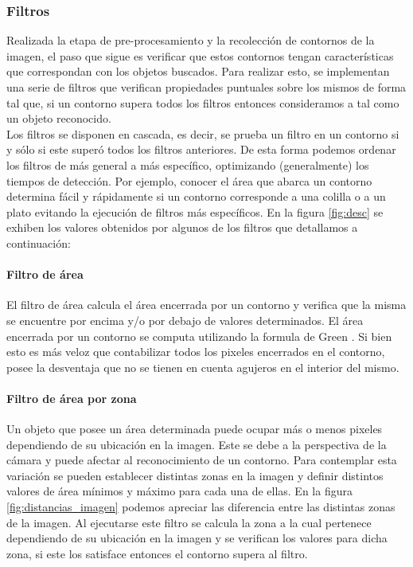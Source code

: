 	

	\subsubsection{\label{sec:filtros} Filtros}
	Realizada la etapa de pre-procesamiento y la recolecci\'on de contornos 
	de la imagen, el paso que sigue es verificar que estos
	contornos tengan caracter\'isticas que correspondan con  los 
	objetos buscados. Para realizar esto, se implementan una serie de filtros que verifican propiedades
	puntuales sobre los mismos de forma tal que, si un contorno supera todos los filtros entonces consideramos a tal como un objeto reconocido. \\
	\indent Los filtros se disponen en cascada, es decir, se prueba un 
	filtro en un contorno si y s\'olo si este super\'o todos los filtros 
	anteriores. De esta forma podemos ordenar los filtros de m\'as general 
	a m\'as espec\'ifico, optimizando (generalmente) los tiempos de detecci\'on. Por ejemplo, conocer 
	el \'area que abarca un contorno determina f\'acil y r\'apidamente si un contorno corresponde a una colilla o a un plato evitando la ejecuci\'on
	de filtros m\'as espec\'ificos. En la figura \ref{fig:desc} se exhiben 
	los valores obtenidos por algunos de los filtros que detallamos a 
	continuaci\'on:
	\paragraph{Filtro de \'area}
	El filtro de \'area calcula el \'area encerrada por un contorno y verifica que la misma se encuentre por encima y/o por debajo
	de valores determinados. El \'area encerrada por un contorno se computa utilizando la formula de Green \cite{greenwolfram}.
	Si bien esto es m\'as veloz que contabilizar todos los pixeles encerrados en el contorno, posee la desventaja que no se tienen en cuenta agujeros
	en el interior del mismo.
	\paragraph{Filtro de \'area por zona}
	Un objeto que posee un \'area determinada puede ocupar m\'as o menos pixeles dependiendo de su ubicaci\'on en la imagen. Este se debe a la 
	perspectiva de la c\'amara y puede afectar al reconocimiento de un contorno. Para contemplar esta variaci\'on se pueden establecer distintas
	zonas en la imagen y definir distintos valores de \'area m\'inimos y m\'aximo para cada una de ellas. En la figura 
	\ref{fig:distancias_imagen} podemos apreciar las diferencia entre las distintas zonas de la imagen. 
	Al ejecutarse este filtro se calcula la
	zona a la cual pertenece dependiendo de su ubicaci\'on en la imagen y se verifican los valores para dicha zona, si este los satisface entonces
	el contorno supera al filtro.
